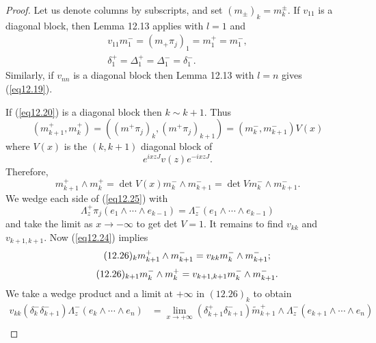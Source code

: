 \documentclass{surv-l}
\theoremstyle{plain}
\theoremstyle{definition}
\numberwithin{equation}{chapter}
\begin{document}
\begin{proof}
Let us denote columns by subscripts, and set $(m_{\pm})_{k}=m_{k}^{\pm}$. If $v_{11}$ is a diagonal block, then Lemma 12.13 applies with $l=1$ and
\begin{equation*}
\begin{array}{c}
v_{11}m_{1}^{-}=(m_{+}\pi_{j})_{1}=m_{1}^{+}=m_{1}^{-},\\
\delta_{1}^{+}=\Delta_{1}^{+}=\Delta_{1}^{-}=\delta_{1}^{-}.
\end{array}
\end{equation*}
Similarly, if $v_{nn}$ is a diagonal block then Lemma 12.13 with $l=n$ gives (\ref{eq12.19}).

If (\ref{eq12.20}) is a diagonal block then $k\sim k+1$. Thus
\begin{equation}\label{eq12.24}
(m_{k+1}^{+}, m_{k}^{+})=((m^{+}\pi_{j})_{k}, (m^{+}\pi_{j})_{k+1})=(m_{k}^{-}, m_{k+1}^{-})V(x)
\end{equation}
where $V(x)$ is the $(k, k+1)$ diagonal block of
\begin{equation*}
e^{ixzJ}v(z)e^{-ixzJ}.
\end{equation*}
Therefore,
\begin{equation}\label{eq12.25}
m_{k+1}^{+}\wedge m_{k}^{+}=\det V(x)m_{k}^{-}\wedge m_{k+1}^{-}=\det Vm_{k}^{-}\wedge m_{k+1}^{-}.
\end{equation}
We wedge each side of (\ref{eq12.25}) with
\begin{equation*}
\Lambda_{z}^{+}\pi_{j}(e_{1}\wedge\cdots \wedge e_{k-1})=\Lambda_{z}^{-}(e_{1}\wedge\cdots\wedge e_{k-1})
\end{equation*}
and take the limit as $ x\rightarrow -\infty$ to get det $V=1$. It remains to find $v_{kk}$ and $v_{k+1,k+1}$. Now (\ref{eq12.24}) implies
\begin{equation*}
\tag*{$(12.26)_{k}$}  m_{k+1}^{+}\wedge m_{k+1}^{-}=v_{kk}m_{k}^{-}\wedge m_{k+1}^{-};
\end{equation*}
\begin{equation*}
\tag*{$(12.26)_{k+1}$}  m_{k}^{-}\wedge m_{k}^{+}=v_{k+1,k+1}m_{k}^{-}\wedge m_{k+1}^{-}.
\end{equation*}
We take a wedge product and a limit at $+\infty$ in $(12.26)_{k}$ to obtain
\setcounter{equation}{26}\begin{align}\label{eq12.27}
v_{kk}(\delta_{k}^{-}\delta_{k+1}^{-})\Lambda_{z}^{-}(e_{k}\wedge\cdots \wedge e_{n})
&= \lim_{x\rightarrow+\infty}(\delta_{k+1}^{+}\delta_{k+1}^{-})\tilde{m}_{k+1}^{+}\wedge\Lambda_{z}^{-}(e_{k+1}\wedge\cdots\wedge e_{n})\\\nonumber

\end{align}
\end{proof}
\end{document}

